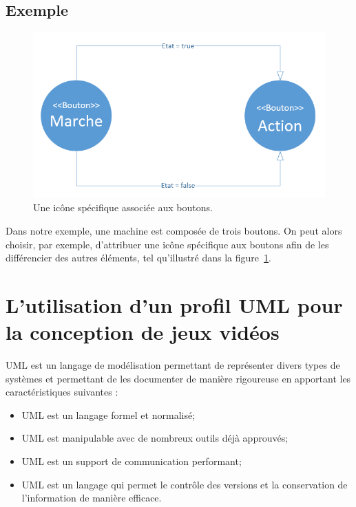 \subsection*{Exemple}
%
\begin{figure}
    \begin{center}
    \includegraphics[width=12cm]{10_img/chap4/img.PNG}
    \caption{Une ic\^one spécifique associ\'ee aux boutons.}
    \label{fig.uml_img}
    \end{center}
\end{figure}

Dans notre exemple, une machine est composée de trois boutons.
On peut alors choisir, par exemple, d'attribuer une ic\^one spécifique aux boutons afin de les différencier des autres éléments, tel qu'illustr\'e dans la figure~\ref{fig.uml_img}.




\section{L'utilisation d'un profil UML pour la conception de jeux vidéos}


UML est un langage de modélisation permettant de représenter divers types de systèmes et permettant de les documenter de manière rigoureuse en apportant les caractéristiques suivantes :

\begin{itemize}
    \item UML est un langage formel et normalisé;
    \item UML est manipulable avec de nombreux outils déjà approuvés;
    \item UML est un support de communication performant;
    \item UML est un langage qui permet le contrôle des versions et la conservation de l'information de manière efficace.
\end{itemize}

